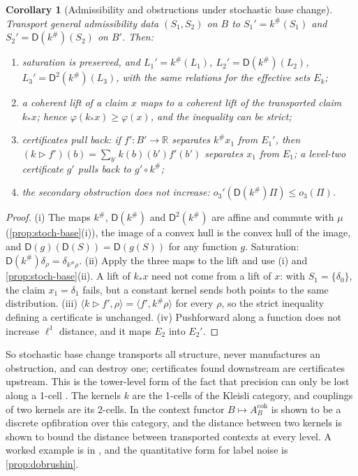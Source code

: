 \documentclass[11pt]{article}
\newtheorem{corollary}[theorem]{Corollary}
\theoremstyle{definition}
\theoremstyle{remark}
\newcommand{\D}{\mathsf{D}}
\begin{document}
\begin{corollary}[Admissibility and obstructions under stochastic base change]\label{cor:stoch-adm}
Transport general admissibility data $(S_1,S_2)$ on $B$ to $S_1'=k^\#(S_1)$ and $S_2'=\D(k^\#)(S_2)$ on
$B'$. Then:
\begin{enumerate}[label=(\roman*)]
\item saturation is preserved, and $L_1'=k^\#(L_1)$, $L_2'=\D(k^\#)(L_2)$, $L_3'=\D^2(k^\#)(L_3)$, with
  the same relations for the effective sets $E_k$;
\item a coherent lift of a claim $x$ maps to a coherent lift of the transported claim $k_*x$; hence
  $\varphi(k_*x)\ge\varphi(x)$, and the inequality can be strict;
\item certificates pull back: if $f'\colon B'\to\mathbb{R}$ separates $k^\#x_1$ from $E_1'$, then
  $(k\rhd f')(b)=\sum_{b'}k(b)(b')f'(b')$ separates $x_1$ from $E_1$; a level-two certificate
  $g'$ pulls back to $g'\circ k^\#$;
\item the secondary obstruction does not increase: $o_3'(\D(k^\#)\Pi)\le o_3(\Pi)$.
\end{enumerate}
\end{corollary}
\begin{proof}
(i) The maps $k^\#$, $\D(k^\#)$ and $\D^2(k^\#)$ are affine and commute with $\mu$ (\cref{prop:stoch-base}(i)),
the image of a convex hull is the convex hull of the image, and $\D(g)(\D(S))=\D(g(S))$ for any function
$g$. Saturation: $\D(k^\#)\delta_\rho=\delta_{k^\#\rho}$. (ii) Apply the three maps to the lift and use (i)
and \cref{prop:stoch-base}(ii). A lift of $k_*x$ need not come from a lift of $x$: with
$S_1=\{\delta_0\}$, the claim $x_1=\delta_1$ fails, but a constant kernel sends both points to the same
distribution. (iii) $\langle k\rhd f',\rho\rangle=\langle f',k^\#\rho\rangle$ for every $\rho$, so the
strict inequality defining a certificate is unchanged. (iv) Pushforward along a function does not
increase $\ell^1$ distance, and it maps $E_2$ into $E_2'$.
\end{proof}

So stochastic base change transports all structure, never manufactures an obstruction, and can
destroy one; certificates found downstream are certificates upstream. This is the tower-level form of
the fact that precision can only be lost along a 1-cell \cite[Prop.~7.3]{Awasthi-Attribution}. The kernels
$k$ are the 1-cells of the Kleisli category, and couplings of two kernels are its 2-cells. In
\cite[Thm.~2.3, Section~3]{Conditionals} the context functor $B\mapsto A_B^{\mathrm{coh}}$ is shown to be a discrete opfibration over this
category, and the distance between two kernels is shown to bound the distance between transported contexts at every
level. A worked example is in \cite[Section~11]{Awasthi-Family}, and the quantitative form for label noise is \cref{prop:dobrushin}.
\end{document}
